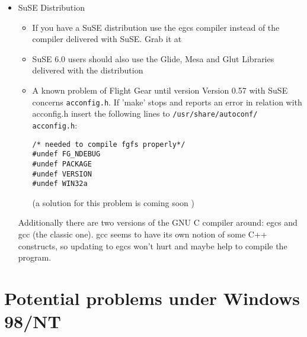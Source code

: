 \begin{itemize}
\item{SuSE Distribution}
\begin{itemize}
 \item If you have a SuSE distribution use the egcs compiler instead
of the compiler delivered with SuSE. Grab it at


 \item SuSE 6.0 users should also use the Glide,
Mesa and Glut Libraries delivered with the distribution
 \item A known problem of Flight Gear until version Version 0.57 with SuSE concerns
  \texttt{acconfig.h}. If 'make' stops and reports an error in relation with acconfig.h
insert the following lines to \texttt{/usr/share/autoconf/} \texttt{acconfig.h}:

        \texttt{/* needed to compile fgfs properly*/}\\
        \texttt{{\#}undef FG\_NDEBUG}\\
        \texttt{{\#}undef PACKAGE}\\
        \texttt{{\#}undef VERSION}\\
        \texttt{{\#}undef WIN32a}

(a solution for this problem is coming soon )
\end{itemize}

  Additionally there are two versions of the GNU C compiler around:
  egcs and gcc (the classic one). gcc seems to have its own notion of
  some C++ constructs, so updating to egcs won't hurt and maybe help
  to compile the program.

\end{itemize}

\section{Potential problems under Windows 98/NT}


